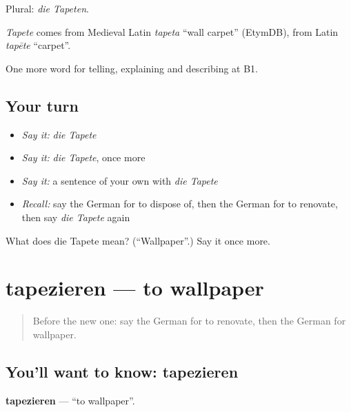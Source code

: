 Plural: \emph{die Tapeten}.

\begin{cousinweb}
\emph{Tapete} comes from Medieval Latin \emph{tapeta} \textquotedblleft{}wall carpet\textquotedblright{} (EtymDB), from Latin \emph{tapēte} \textquotedblleft{}carpet\textquotedblright{}.
\end{cousinweb}

\begin{grammarlens}[title={What you've built}]
One more word for telling, explaining and describing at B1.
\end{grammarlens}

\subsection*{Your turn}
\begin{itemize}
\raggedright
  \item \emph{Say it:} \emph{die Tapete}
  \item \emph{Say it:} \emph{die Tapete}, once more
  \item \emph{Say it:} a sentence of your own with \emph{die Tapete}
  \item \emph{Recall:} say the German for to dispose of, then the German for to renovate, then say \emph{die Tapete} again
\end{itemize}

\begin{tcolorbox}[breakable,colback=teal!4,colframe=teal!35!black,title={Before you move on}]
What does die Tapete mean? (\textquotedblleft{}Wallpaper\textquotedblright{}.) Say it once more.
\end{tcolorbox}
\section[tapezieren]{tapezieren — to wallpaper}

\label{lesson:GE-C529-tapezieren}



\begin{quote}
Before the new one: say the German for to renovate, then the German for wallpaper.
\end{quote}

\subsection*{You'll want to know: tapezieren}
\textbf{tapezieren} — \textquotedblleft{}to wallpaper\textquotedblright{}.

